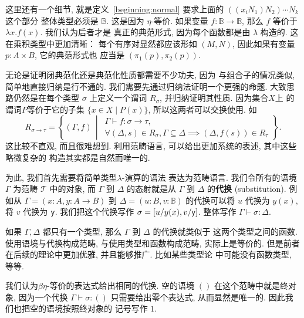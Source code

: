 这里还有一个细节, 就是定义~\ref{beginning:normal}
要求上面的 \(((x_iN_1)N_2) \cdots N_k\) 这个部分
整体类型必须是 \(\mathbb B\). 这是因为 \(\eta\)-等价.
如果变量 \(f : \mathbb B \to \mathbb B\), 那么
\(f\) 等价于 \(\lambda x. f(x)\). 我们认为后者才是
真正的典范形式, 因为每个函数都是由 \(\lambda\) 构造的.
这在乘积类型中更加清晰： 每个有序对显然都应该形如 \((M, N)\),
因此如果有变量 \(p : A \times B\), 它的典范形式也
应当是 \((\pi_1(p), \pi_2(p))\).

无论是证明闭典范化还是典范化性质都需要不少功夫, 因为
与组合子的情况类似, 简单地直接归纳是行不通的.
我们需要先通过归纳法证明一个更强的命题.
大致思路仍然是在每个类型 \(\sigma\) 上定义一个谓词
\(R_\sigma\), 并归纳证明其性质. 因为集合\(X\)上
的谓词\(P\)等价于它的子集 \(\{x\in X\mid P(x)\}\),
所以这两者可以交换使用. 如
\[R_{\sigma \to \tau} = \left\{(\Gamma, f) \,\middle|\,
\begin{matrix}
\Gamma \vdash f:\sigma\to\tau, \\
\forall (\Delta, s) \in R_\sigma,
\Gamma \subseteq \Delta \implies
(\Delta, f(s)) \in R_\tau
\end{matrix}
\right\}.\]
这比较不直观, 而且很难想到.
利用范畴语言, 可以给出更加系统的表述, 其中这些略微复杂的
构造其实都是自然而唯一的.

为此, 我们首先需要将简单类型\(\lambda\)-演算的语法
表达为范畴语言. 我们令所有的语境 \(\Gamma\) 为范畴
\(\mathcal T\) 中的对象, 而 \(\Gamma\) 到 \(\Delta\)
的态射就是从 \(\Gamma\) 到 \(\Delta\)
的\textbf{代换} (substitution). 例如从
\(\Gamma = (x{:}A, y{:}A \to B)\) 到
\(\Delta = (u{:}B, v{:}\mathbb B)\) 的代换可以将
\(u\) 代换为 \(y(x)\), 将 \(v\) 代换为 \(\textnormal{\textsf{y}}\).
我们把这个代换写作 \(\sigma = [u/y(x), v/\textnormal{\textsf{y}}]\).
整体写作 \(\Gamma \vdash \sigma : \Delta\).

如果 \(\Gamma, \Delta\) 都只有一个类型,
那么 \(\Gamma\) 到 \(\Delta\) 的代换就类似于
这两个类型之间的函数. 使用语境与代换构成范畴,
与使用类型和函数构成范畴, 实际上是等价的. 但是前者
在后续的理论中更加优雅, 并且能够推广. 比如某些类型论
中可能没有函数类型, 等等.

我们认为\(\beta\eta\)-等价的表达式给出相同的代换.
空的语境 \(()\) 在这个范畴中就是终对象, 因为一个代换
\(\Gamma \vdash \sigma : ()\) 只需要给出零个表达式,
从而显然是唯一的. 因此我们也把空的语境按照终对象的
记号写作 \(1\).

